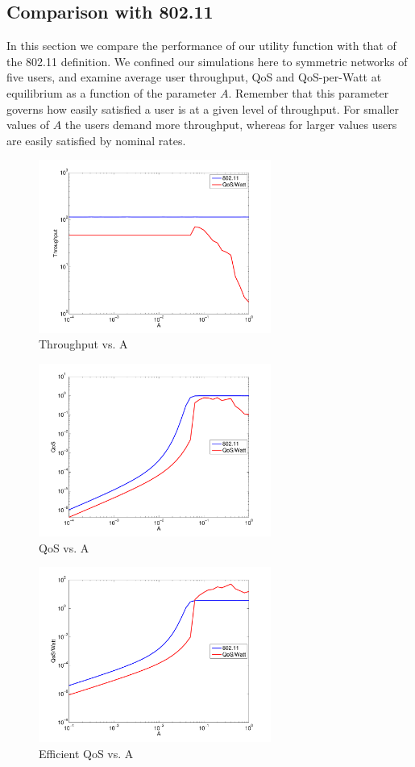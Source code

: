 \documentclass[conference]{IEEEtran}
\theoremstyle{definition}
\begin{document}
\subsection{Comparison with 802.11}
In this section we compare the performance of our utility function with that of the 802.11 definition. We confined our simulations here to symmetric networks of five users, and examine average user throughput, QoS and QoS-per-Watt at equilibrium as a function of the parameter $A$. Remember that this parameter governs how easily satisfied a user is at a given level of throughput. For smaller values of $A$ the users demand more throughput, whereas for larger values users are easily satisfied by nominal rates.
\begin{figure}[htp]
\begin{center}
\includegraphics[width=3in]{sim2a.pdf}
\caption{Throughput vs. A}
\label{fig:sim2a}
\end{center}
%
\end{figure}
\begin{figure}[htp]
\begin{center}
\includegraphics[width=3in]{sim2b.pdf}
\caption{QoS vs. A}
\label{fig:sim2b}
\end{center}
\end{figure}
%
\begin{figure}[htp]
\begin{center}
\includegraphics[width=3in]{sim2c.pdf}
\caption{Efficient QoS vs. A}
\label{fig:sim2c}
\end{center}
\end{figure}
\end{document}
